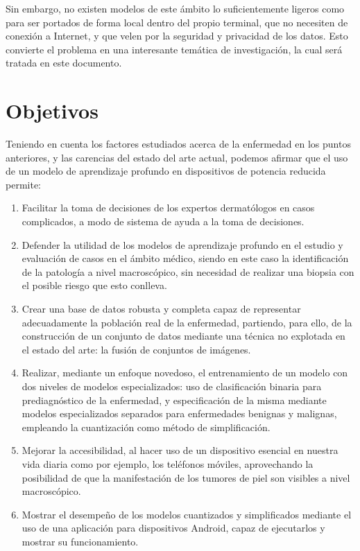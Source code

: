 Sin embargo, no existen modelos de este ámbito lo suficientemente ligeros como para ser portados de forma local dentro del propio terminal, que no necesiten de conexión a Internet, y que velen por la seguridad y privacidad de los datos. Esto convierte el problema en una interesante temática de investigación, la cual será tratada en este documento.

\section{Objetivos}
\label{cap:objetivos}

Teniendo en cuenta los factores estudiados acerca de la enfermedad en los puntos anteriores, y las carencias del estado del arte actual, podemos afirmar que el uso de un modelo de aprendizaje profundo en dispositivos de potencia reducida permite:
\begin{enumerate}
	\item Facilitar la toma de decisiones de los expertos dermatólogos en casos complicados, a modo de sistema de ayuda a la toma de decisiones.
	\item Defender la utilidad de los modelos de aprendizaje profundo en el estudio y evaluación de casos en el ámbito médico, siendo en este caso la identificación de la patología a nivel macroscópico, sin necesidad de realizar una biopsia con el posible riesgo que esto conlleva.
	\item Crear una base de datos robusta y completa capaz de representar adecuadamente la población real de la enfermedad, partiendo, para ello, de la construcción de un conjunto de datos mediante una técnica no explotada en el estado del arte: la fusión de conjuntos de imágenes.
	\item Realizar, mediante un enfoque novedoso, el entrenamiento de un modelo con dos niveles de modelos especializados: uso de clasificación binaria para prediagnóstico de la enfermedad, y especificación de la misma mediante modelos especializados separados para enfermedades benignas y malignas, empleando la cuantización como método de simplificación.
	\item Mejorar la accesibilidad, al hacer uso de un dispositivo esencial en nuestra vida diaria como por ejemplo, los teléfonos móviles, aprovechando la posibilidad de que la manifestación de los tumores de piel son visibles a nivel macroscópico.
	\item Mostrar el desempeño de los modelos cuantizados y simplificados mediante el uso de una aplicación para dispositivos Android, capaz de ejecutarlos y mostrar su funcionamiento.
\end{enumerate}


